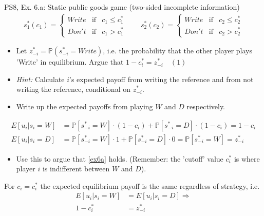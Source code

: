 \begin{frame}{PS8, Ex. 6.a: Static public goods game (two-sided incomplete information)}
    \begin{align*}
      s_1^*(c_1)=\left\{\begin{array}{rcl}
        Write & \text{if} & c_1\leq c_1^*\\
        Don't & \text{if} & c_1>c_1^*
        \end{array}\right.\quad\quad
      s_2^*(c_2)=\left\{\begin{array}{rcl}
        Write & \text{if} & c_2\leq c_2^*\\
        Don't & \text{if} & c_2>c_2^*
        \end{array}\right.
    \end{align*}
    \vspace{-12pt}
    \begin{itemize}
      \item[(a)] Let $z_{-i}^* = \mathbb{P}(s_{-i}^*=Write)$, i.e. the probability that the other player plays 'Write' in equilibrium. Argue that $1-c_i^*=z_{-i}^*\quad(1)$
      \item[] \textit{Hint:} Calculate $i$'s expected payoff from writing the reference and from not writing the reference, conditional on $z_{-i}^*$.
    \end{itemize}
    \vspace{-8pt}
    \begin{itemize}
      \item[Step 1:] Write up the expected payoffs from playing $W$ and $D$ respectively.
    \end{itemize}
    \vspace{-8pt}
    \begin{align*}
      E[u_i|s_i=W]&=\mathbb{P}\left[s_{-i}^*=W\right]\cdot(1-c_i)+\mathbb{P}\left[s_{-i}^*=D\right]\cdot(1-c_i)=1-c_i\\
      E[u_i|s_i=D]&=\mathbb{P}\left[s_{-i}^*=W\right]\cdot1+\mathbb{P}\left[s_{-i}^*=D\right]\cdot0=\mathbb{P}\left[s_{-i}^*=W\right]=z_{-i}^*
    \end{align*}
    \vspace{-16pt}
    \begin{itemize}
      \item[Step 2:] Use this to argue that \eqref{ex6a} holds. (Remember: the 'cutoff' value $c_i^*$ is where player $i$ is indifferent between $W$ and $D$).
    \end{itemize}
    For $c_i=c_i^*$ the expected equilibrium payoff is the same regardless of strategy, i.e.
    \begin{align*}
      E[u_i|s_i=W]&=E[u_i|s_i=D]\Rightarrow\\
      1-c_i^*&=z_{-i}^*
    \end{align*}
    \vfill\null
\end{frame}


